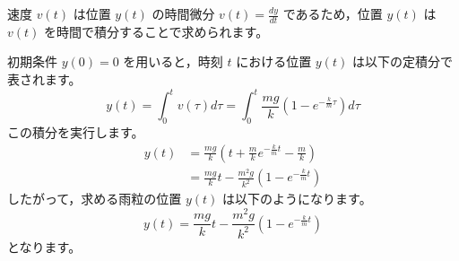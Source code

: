 \begin{solutionparts}
速度 $v(t)$ は位置 $y(t)$ の時間微分 $v(t) = \frac{dy}{dt}$ であるため，位置 $y(t)$ は $v(t)$ を時間で積分することで求められます。
\par
初期条件 $y(0) = 0$ を用いると，時刻 $t$ における位置 $y(t)$ は以下の定積分で表されます。
\begin{equation*}
y(t) = \int_0^t v(\tau) d\tau = \int_0^t \frac{mg}{k} \left( 1 - e^{-\frac{k}{m} \tau} \right) d\tau
\end{equation*}
この積分を実行します。
\begin{equation*}
\begin{aligned}
y(t) &= \frac{mg}{k} \left( t + \frac{m}{k} e^{-\frac{k}{m} t} - \frac{m}{k} \right) \\
&= \frac{mg}{k} t - \frac{m^2 g}{k^2} \left( 1 - e^{-\frac{k}{m} t} \right)
\end{aligned}
\end{equation*}
したがって，求める雨粒の位置 $y(t)$ は以下のようになります。
\begin{equation*}
y(t) = \frac{mg}{k} t - \frac{m^2 g}{k^2} \left( 1 - e^{-\frac{k}{m} t} \right)
\end{equation*}
となります。

\end{solutionparts}
